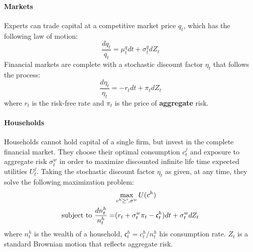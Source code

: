 \documentclass[12pt,english]{article}
\begin{document}
\paragraph{Markets} Experts can trade capital at a competitive market price $q_t$, which has the following law of motion:
\begin{equation}
\frac{dq_t}{q_t} = \mu_t^qdt + \sigma_t^qdZ_t
\end{equation}
Financial markets are complete with a stochastic discount factor $\eta_t$ that follows the process:
\begin{equation}
\frac{d\eta_t}{\eta_t} = - r_tdt + \pi_tdZ_t
\end{equation}
where $r_t$ is the risk-free rate and $\pi_t$ is the price of \textbf{aggregate} risk. 

\paragraph{Households}
Households cannot hold capital of a single firm, but invest in the complete financial market. They choose their optimal consumption $c^j_t$ and exposure to aggregate risk $\sigma_t^w$ in order to maximize discounted infinite life time expected utilities $U^j_t$. Taking the stochastic discount factor $\eta_t$ as given, at any time, they solve the following maximization problem:
\begin{align*}
&\max_{c^h\geq', \sigma^w} U(c^h)\\
\text{subject to }\frac{dn_t^h}{n_t^h} = &(r_t + \sigma_t^w\pi_t - \frak{c}^h_t)dt + \sigma_t^wdZ_t
\end{align*}
where $n^h_t$ is the wealth of a household, $ \mathfrak{c}^h_t  = c^h_t /n^h_t $ his consumption rate. $Z_t$ is a standard Brownian motion that reflects aggregate risk.
\end{document}
